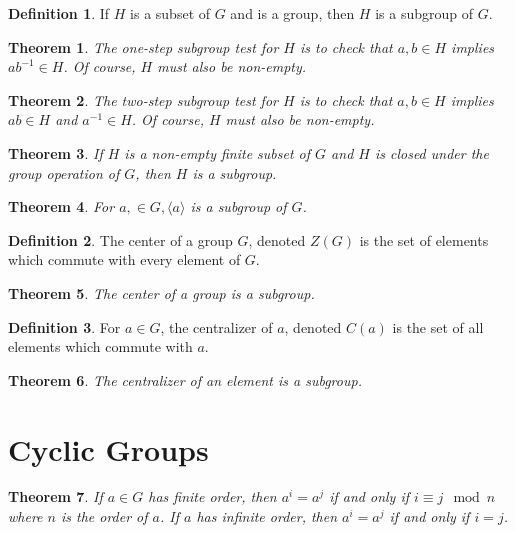 \documentclass{article}
\newtheorem{theorem}{Theorem}[section]
\theoremstyle{definition}
\newtheorem*{definition}{Definition}
\begin{document}
\begin{definition}
    If $H$ is a subset of $G$ and is a group, then $H$ is a subgroup of $G$.
\end{definition}

\begin{theorem}
    The one-step subgroup test for $H$ is to check that $a, b \in H$ implies $ab^{-1} \in H$. Of course, $H$ must also be non-empty.
\end{theorem}

\begin{theorem}
    The two-step subgroup test for $H$ is to check that $a, b \in H$ implies $ab \in H$ and $a^{-1} \in H$. Of course, $H$ must also be non-empty.
\end{theorem}
    
\begin{theorem}
    If $H$ is a non-empty finite subset of $G$ and $H$ is closed under the group operation of $G$, then $H$ is a subgroup. 
\end{theorem}

\begin{theorem}
    For $a, \in G, \langle a \rangle$ is a subgroup of $G$.
\end{theorem}

\begin{definition}
    The center of a group $G$, denoted $Z(G)$ is the set of elements which commute with every element of $G$. 
\end{definition}

\begin{theorem}
    The center of a group is a subgroup.
\end{theorem}

\begin{definition}
    For $a \in G$, the centralizer of $a$, denoted $C(a)$ is the set of all elements which commute with $a$. 
\end{definition}

\begin{theorem}
    The centralizer of an element is a subgroup.
\end{theorem}

\section{Cyclic Groups}

\begin{theorem}
    If $a \in G$ has finite order, then $a^i = a^j$ if and only if $i \equiv j \mod n$ where $n$ is the order of $a$. If $a$ has infinite order, then $a^i = a^j$ if and only if $i = j$.
\end{theorem}
\end{document}
